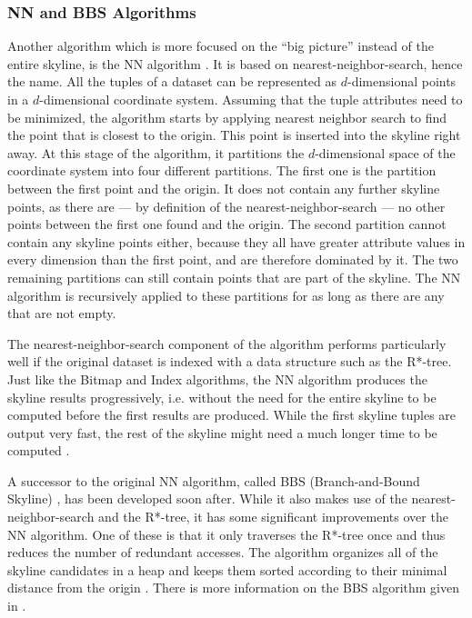 \subsubsection{NN and BBS Algorithms} \label{subsection:nn-bbs}
Another algorithm which is more focused on the ``big picture'' instead of the entire skyline, is the NN algorithm \cite{nn}. It is based on nearest-neighbor-search, hence the name. All the tuples of a dataset can be represented as $d$-dimensional points in a $d$-dimensional coordinate system. Assuming that the tuple attributes need to be minimized, the algorithm starts by applying nearest neighbor search to find the point that is closest to the origin. This point is inserted into the skyline right away. At this stage of the algorithm, it partitions the $d$-dimensional space of the coordinate system into four different partitions. The first one is the partition between the first point and the origin. It does not contain any further skyline points, as there are --- by definition of the nearest-neighbor-search --- no other points between the first one found and the origin. The second partition cannot contain any skyline points either, because they all have greater attribute values in every dimension than the first point, and are therefore dominated by it. The two remaining partitions can still contain points that are part of the skyline. The NN algorithm is recursively applied to these partitions for as long as there are any that are not empty. 

The nearest-neighbor-search component of the algorithm performs particularly well if the original dataset is indexed with a data structure such as the R*-tree. Just like the Bitmap and Index algorithms, the NN algorithm produces the skyline results progressively, i.e. without the need for the entire skyline to be computed before the first results are produced. While the first skyline tuples are output very fast, the rest of the skyline might need a much longer time to be computed \cite{nn}. 

A successor to the original NN algorithm, called BBS (Branch-and-Bound Skyline) \cite{bbs}, has been developed soon after. While it also makes use of the nearest-neighbor-search and the R*-tree, it has some significant improvements over the NN algorithm. One of these is that it only traverses the R*-tree once and thus reduces the number of redundant accesses. The algorithm organizes all of the skyline candidates in a heap and keeps them sorted according to their minimal distance from the origin \cite{survey}. There is more information on the BBS algorithm given in \cite{bbs}. 

